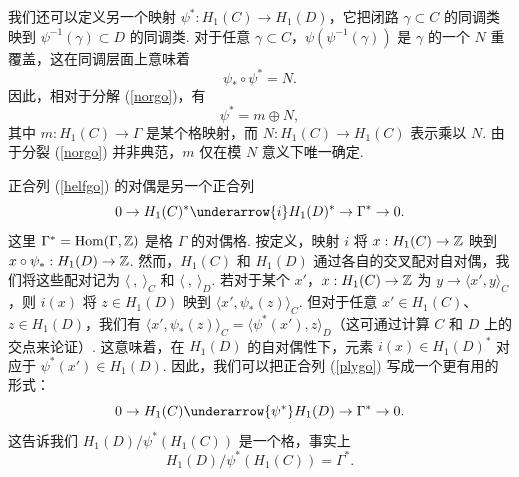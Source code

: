 我们还可以定义另一个映射 $\psi^*:H_1(C)\to H_1(D)$，它把闭路 $\gamma\subset C$ 的同调类映到 $\psi^{-1}(\gamma)\subset D$ 的同调类. 对于任意 $\gamma\subset C$，$\psi(\psi^{-1}(\gamma))$ 是 $\gamma$ 的一个 $N$ 重覆盖，这在同调层面上意味着
\begin{equation}\label{ilbo}\psi_*\circ\psi^*=N.\end{equation}
因此，相对于分解 (\ref{norgo})，有
\begin{equation}\label{milbo}\psi^*=m\oplus N,\end{equation}
其中 $m:H_1(C)\to\Gamma$ 是某个格映射，而 $N:H_1(C)\to
H_1(C)$ 表示乘以 $N$. 由于分裂 (\ref{norgo}) 并非典范，$m$ 仅在模 $N$ 意义下唯一确定.

正合列 (\ref{helfgo}) 的对偶是另一个正合列
\begin{equation}\label{plygo}0\to H_1(C)^*\underarrow{i} H_1(D)^*\to
\Gamma^*\to 0.\end{equation} 这里 $\Gamma^*={\rm
Hom}(\Gamma,\Bbb{Z})$ 是格 $\Gamma$ 的对偶格. 按定义，映射 $i$ 将 $x:H_1(C)\to \Bbb{Z}$ 映到 $x\circ
\psi_*:H_1(D)\to \Bbb{Z}$. 然而，$H_1(C)$ 和 $H_1(D)$ 通过各自的交叉配对自对偶，我们将这些配对记为 $\langle~,~\rangle_C$ 和 $\langle ~,~\rangle_D$. 若对于某个 $x'$，$x:H_1(C)\to
\Bbb{Z}$ 为 $y\to \langle x',y\rangle_C$，则 $i(x)$ 将 $z\in H_1(D)$ 映到 $\langle x',\psi_*(z)\rangle_C$. 但对于任意 $x'\in H_1(C)$、$z\in H_1(D)$，我们有 $\langle
x',\psi_*(z)\rangle_C =\langle \psi^*(x'),z\rangle_D$（这可通过计算 $C$ 和 $D$ 上的交点来论证）. 这意味着，在 $H_1(D)$ 的自对偶性下，元素 $i(x)\in
H_1(D)^*$ 对应于 $\psi^*(x')\in H_1(D)$. 因此，我们可以把正合列 (\ref{plygo}) 写成一个更有用的形式：
\begin{equation}\label{lygo}
0\to H_1(C)\underarrow{\psi^*} H_1(D)\to \Gamma^*\to
0.\end{equation} 这告诉我们 $H_1(D)/\psi^* (H_1(C))$ 是一个格，事实上
\begin{equation}\label{polyfo}
H_1(D)/\psi^*(H_1(C))=\Gamma^*.\end{equation}

